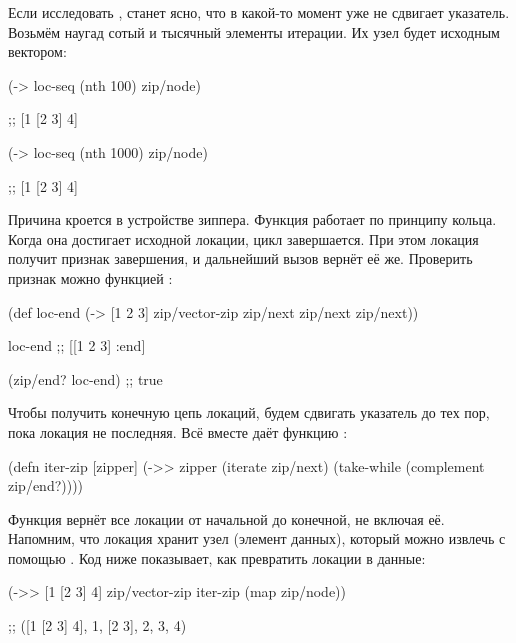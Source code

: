 Если исследовать , станет ясно, что в какой-то момент  уже не
сдвигает указатель. Возьмём наугад сотый и тысячный элементы итерации. Их узел
будет исходным вектором:

\begin{english}
  \begin{clojure}
(-> loc-seq (nth 100) zip/node)

;; [1 [2 3] 4]

(-> loc-seq (nth 1000) zip/node)

;; [1 [2 3] 4]

  \end{clojure}
\end{english}

Причина кроется в устройстве зиппера. Функция  работает по принципу
кольца. Когда она достигает исходной локации, цикл завершается. При этом локация
получит признак завершения, и дальнейший вызов  вернёт её
же. Проверить признак можно функцией :


\begin{english}
  \begin{clojure}
(def loc-end
  (-> [1 2 3]
      zip/vector-zip
      zip/next
      zip/next
      zip/next))

loc-end
;; [[1 2 3] :end]

(zip/end? loc-end)
;; true

  \end{clojure}
\end{english}

Чтобы получить конечную цепь локаций, будем сдвигать указатель до тех пор, пока
локация не последняя. Всё вместе даёт функцию :

\begin{english}
  \begin{clojure}
(defn iter-zip [zipper]
  (->> zipper
       (iterate zip/next)
       (take-while (complement zip/end?))))
  \end{clojure}
\end{english}

Функция вернёт все локации от начальной до конечной, не включая её. Напомним, что
локация хранит узел (элемент данных), который можно извлечь с помощью
. Код ниже показывает, как превратить локации в данные:

\begin{english}
  \begin{clojure}
(->> [1 [2 3] 4]
     zip/vector-zip
     iter-zip
     (map zip/node))

;; ([1 [2 3] 4], 1, [2 3], 2, 3, 4)
  \end{clojure}
\end{english}

